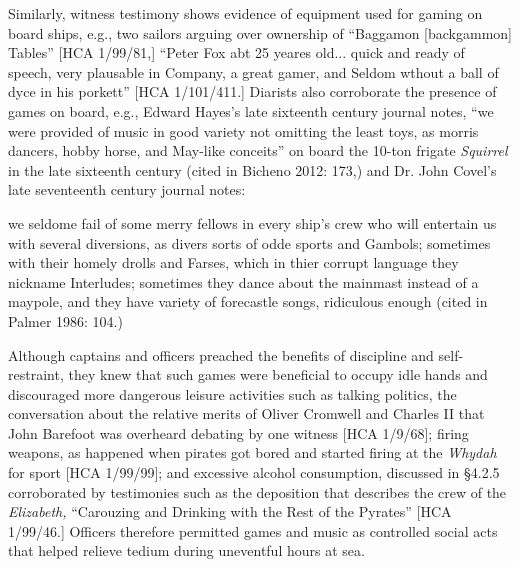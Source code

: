 \begin{styleStandard}
Similarly, witness testimony shows evidence of equipment used for gaming on board ships, e.g., two sailors arguing over ownership of “Baggamon [backgammon] Tables” [HCA 1/99/81,] “Peter Fox abt 25 yeares old... quick and ready of speech, very plausable in Company, a great gamer, and Seldom wthout a ball of dyce in his porkett” [HCA 1/101/411.] Diarists also corroborate the presence of games on board, e.g., Edward Hayes’s late sixteenth century journal notes, “we were provided of music in good variety not omitting the least toys, as morris dancers, hobby horse, and May-like conceits” on board the 10-ton frigate \textit{Squirrel} in the late sixteenth century (cited in Bicheno 2012: 173,) and Dr. John Covel’s late seventeenth century journal notes:
\end{styleStandard}


\begin{styleStandard}
we seldome fail of some merry fellows in every ship’s crew who will entertain us with several diversions, as divers sorts of odde sports and Gambols; sometimes with their homely drolls and Farses, which in thier corrupt language they nickname Interludes; sometimes they dance about the mainmast instead of a maypole, and they have variety of forecastle songs, ridiculous enough (cited in Palmer 1986: 104.)
\end{styleStandard}


\begin{styleStandard}
Although captains and officers preached the benefits of discipline and self-restraint, they knew that such games were beneficial to occupy idle hands and discouraged more dangerous leisure activities such as talking politics, the conversation about the relative merits of Oliver Cromwell and Charles II that John Barefoot was overheard debating by one witness [HCA 1/9/68]; firing weapons, as happened when pirates got bored and started firing at the \textit{Whydah} for sport [HCA 1/99/99]; and excessive alcohol consumption, discussed in §4.2.5 corroborated by testimonies such as the deposition that describes the crew of the \textit{Elizabeth, }“Carouzing and Drinking with the Rest of the Pyrates” [HCA 1/99/46.] Officers therefore permitted games and music as controlled social acts that helped relieve tedium during uneventful hours at sea. 
\end{styleStandard}


